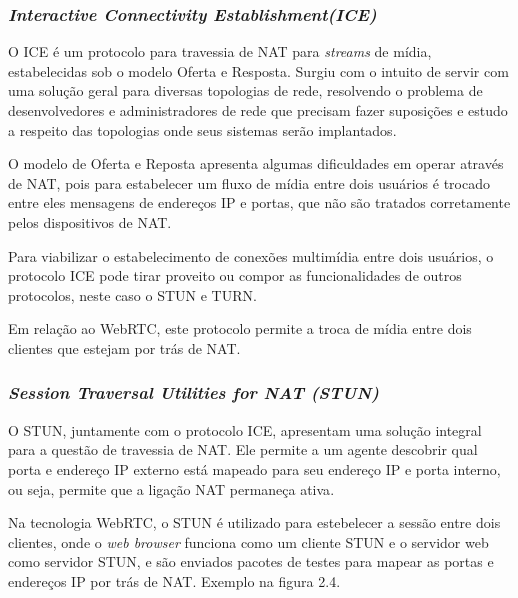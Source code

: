 \documentclass[12pt,a4paper,oneside]{report}
\begin{document}
\subsubsection{\textit{Interactive Connectivity Establishment(ICE)}}

O ICE é um protocolo para travessia de NAT para \textit{streams} de mídia, estabelecidas sob o modelo Oferta e Resposta. Surgiu com o intuito de servir com uma solução geral para diversas topologias de rede, resolvendo o problema de desenvolvedores e administradores de rede que precisam fazer suposições e estudo a respeito das topologias onde seus sistemas serão implantados\cite{Varanda:2008}.

O modelo de Oferta e Reposta apresenta algumas dificuldades em operar através de NAT, pois para estabelecer um fluxo de mídia entre dois usuários é trocado entre eles mensagens de endereços IP e portas, que não são tratados corretamente pelos dispositivos de NAT.

Para viabilizar o estabelecimento de conexões multimídia entre dois usuários, o protocolo ICE pode tirar proveito ou compor as funcionalidades de outros protocolos, neste caso o STUN e TURN. 

Em relação ao WebRTC, este protocolo permite a troca de mídia entre dois clientes que estejam por trás de NAT.

\subsubsection{\textit{Session Traversal Utilities for NAT (STUN)}}

O STUN, juntamente com o protocolo ICE, apresentam uma solução integral para a questão de travessia de NAT. Ele permite a um agente descobrir qual porta e endereço IP externo está mapeado para seu endereço IP e porta interno, ou seja, permite que a ligação NAT permaneça ativa\cite{Varanda:2008}. 

Na tecnologia WebRTC, o STUN é utilizado para estebelecer a sessão entre dois clientes, onde o \textit{web browser} funciona como um cliente STUN e o servidor web como servidor STUN, e são enviados pacotes de testes para mapear as portas e endereços IP por trás de NAT. Exemplo na figura 2.4.
\end{document}
